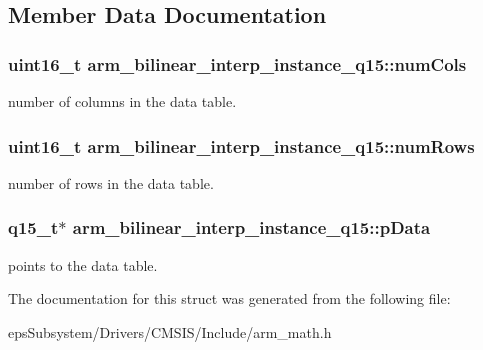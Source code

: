 \subsection{Member Data Documentation}
\hypertarget{structarm__bilinear__interp__instance__q15_a7fa8772d01583374ff8ac18205a26a37}{
\subsubsection[{num\-Cols}]{\setlength{\rightskip}{0pt plus 5cm}uint16\-\_\-t arm\-\_\-bilinear\-\_\-interp\-\_\-instance\-\_\-q15\-::num\-Cols}}\label{structarm__bilinear__interp__instance__q15_a7fa8772d01583374ff8ac18205a26a37}
number of columns in the data table. \hypertarget{structarm__bilinear__interp__instance__q15_a2130ae30a804995a9f5d0e2189e08565}{
\subsubsection[{num\-Rows}]{\setlength{\rightskip}{0pt plus 5cm}uint16\-\_\-t arm\-\_\-bilinear\-\_\-interp\-\_\-instance\-\_\-q15\-::num\-Rows}}\label{structarm__bilinear__interp__instance__q15_a2130ae30a804995a9f5d0e2189e08565}
number of rows in the data table. \hypertarget{structarm__bilinear__interp__instance__q15_a50d75b1316cee3e0dfad6dcc4c9a2954}{
\subsubsection[{p\-Data}]{\setlength{\rightskip}{0pt plus 5cm}q15\-\_\-t$\ast$ arm\-\_\-bilinear\-\_\-interp\-\_\-instance\-\_\-q15\-::p\-Data}}\label{structarm__bilinear__interp__instance__q15_a50d75b1316cee3e0dfad6dcc4c9a2954}
points to the data table. 

The documentation for this struct was generated from the following file\-:\begin{DoxyCompactItemize}
\item 
eps\-Subsystem/\-Drivers/\-C\-M\-S\-I\-S/\-Include/arm\-\_\-math.\-h\end{DoxyCompactItemize}
